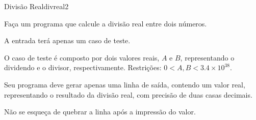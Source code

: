 \documentclass[12pt,a4paper,oneside]{article}
\begin{document}
\begin{problem}{Divisão Real}{divreal}{2}
 
Faça um programa que calcule a divisão real entre dois números.

%

\InputFile

A entrada terá apenas um caso de teste.

O caso de teste é composto por dois valores reais, $A$ e $B$, representando o dividendo e o divisor, respectivamente. Restrições: $0 < A,B < 3.4 \times 10^{38}$.

\OutputFile

Seu programa deve gerar apenas uma linha de saída, contendo um valor real, representando o resultado da divisão real, com precisão de duas casas decimais.

Não se esqueça de quebrar a linha após a impressão do valor.

\Example

\begin{example}
%
\end{example}

\begin{example}
%
\end{example}

\begin{example}
%
\end{example}



\end{problem}
\end{document}

